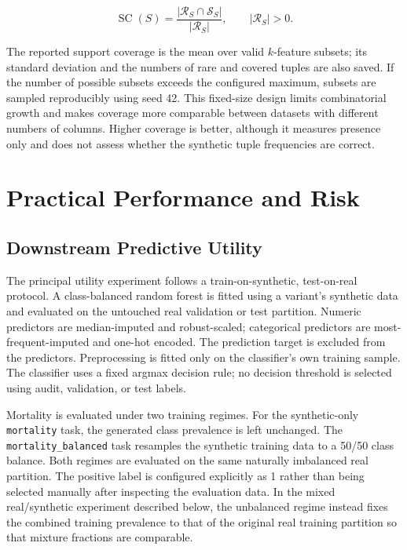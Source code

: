 \begin{equation}
    \operatorname{SC}(S) =
        \frac{|\mathcal{R}_S\cap\mathcal{S}_S|}{|\mathcal{R}_S|},
        \qquad |\mathcal{R}_S|>0.
    \label{eq:evaluation_support_coverage}
\end{equation}

The reported support coverage is the mean over valid $k$-feature subsets; its
standard deviation and the numbers of rare and covered tuples are also saved.
If the number of possible subsets exceeds the configured maximum, subsets are
sampled reproducibly using seed 42. This fixed-size design limits combinatorial
growth and makes coverage more comparable between datasets with different
numbers of columns. Higher coverage is better, although it measures presence
only and does not assess whether the synthetic tuple frequencies are correct.

\section{Practical Performance and Risk}
\label{sec:practical_performance_risk}

\subsection{Downstream Predictive Utility}
\label{subsec:downstream_utility}

The principal utility experiment follows a train-on-synthetic,
test-on-real protocol. A class-balanced random forest is fitted using a
variant's synthetic data and evaluated on the untouched real validation or test
partition. Numeric predictors are median-imputed and robust-scaled;
categorical predictors are most-frequent-imputed and one-hot encoded. The
prediction target is excluded from the predictors. Preprocessing is fitted
only on the classifier's own training sample. The classifier uses a fixed
argmax decision rule; no decision threshold is selected using audit,
validation, or test labels.

Mortality is evaluated under two training regimes. For the synthetic-only
\texttt{mortality} task, the generated class prevalence is left unchanged.
The \texttt{mortality\_balanced} task resamples the synthetic training data to
a 50/50 class balance. Both regimes are evaluated on the same naturally
imbalanced real partition. The positive label is configured explicitly as 1
rather than being selected manually after inspecting the evaluation data. In
the mixed real/synthetic experiment described below, the unbalanced regime
instead fixes the combined training prevalence to that of the original real
training partition so that mixture fractions are comparable.

